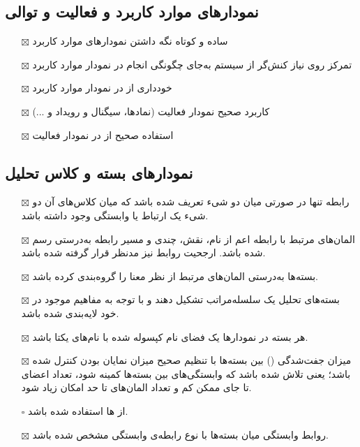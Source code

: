 \subsection{نمودارهای موارد کاربرد و فعالیت و توالی}

\begin{itemize}
	\item[$\boxtimes$]
	ساده و کوتاه نگه داشتن نمودارهای موارد کاربرد
	\item[$\boxtimes$]
	تمرکز روی نیاز کنش‌گر از سیستم به‌جای چگونگی انجام در نمودار موارد کاربرد
	\item[$\boxtimes$]
	خودداری از  در نمودار موارد کاربرد
	\item[$\boxtimes$]
	کاربرد صحیح  نمودار فعالیت (نمادها، سیگنال و رویداد و ...)
	\item[$\boxtimes$]
	استفاده صحیح از  در نمودار فعالیت

\end{itemize}

\subsection{نمودارهای بسته و کلاس تحلیل}

\begin{itemize}
	\item[$\boxtimes$]
	رابطه  تنها در صورتی میان دو شیء تعریف شده باشد که میان کلاس‌های آن دو شیء یک ارتباط یا وابستگی وجود داشته باشد.
	\item[$\boxtimes$]
	المان‌های مرتبط با رابطه  اعم از نام، نقش، چندی و مسیر رابطه به‌درستی رسم شده باشد. ارجحیت روابط نیز مدنظر قرار گرفته شده باشد.
	\item[$\boxtimes$]
	بسته‌ها به‌درستی المان‌های مرتبط از نظر معنا را گروه‌بندی کرده باشد.
	\item[$\boxtimes$]
	بسته‌های تحلیل یک سلسله‌مراتب تشکیل دهند و با توجه به مفاهیم موجود در خود لایه‌بندی شده باشد.
	\item[$\boxtimes$]
	هر بسته در نمودارها یک فضای نام کپسوله شده با نام‌های یکتا باشد.
	\item[$\boxtimes$]
	میزان جفت‌شدگی () بین بسته‌ها با تنظیم صحیح میزان نمایان بودن کنترل شده باشد؛ یعنی تلاش شده باشد که وابستگی‌های بین بسته‌ها کمینه شود، تعداد اعضای  تا جای ممکن کم و تعداد المان‌های  تا حد امکان زیاد شود.
	\item[$\square$]
	از ها استفاده‌ شده باشد.
	\item[$\boxtimes$]
	روابط وابستگی میان بسته‌ها با نوع رابطه‌ی وابستگی مشخص شده باشد.

\end{itemize}

